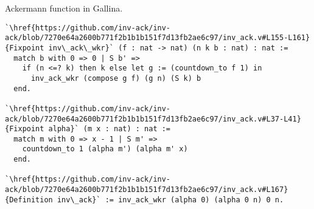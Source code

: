 Ackermann function in Gallina.
\begin{lstlisting}
`\href{https://github.com/inv-ack/inv-ack/blob/7270e64a2600b771f2b1b1b151f7d13fb2ae6c97/inv_ack.v#L155-L161} {Fixpoint inv\_ack\_wkr}` (f : nat -> nat) (n k b : nat) : nat :=
  match b with 0 => 0 | S b' =>
    if (n <=? k) then k else let g := (countdown_to f 1) in
      inv_ack_wkr (compose g f) (g n) (S k) b
  end.

`\href{https://github.com/inv-ack/inv-ack/blob/7270e64a2600b771f2b1b1b151f7d13fb2ae6c97/inv_ack.v#L37-L41}{Fixpoint alpha}` (m x : nat) : nat :=
  match m with 0 => x - 1 | S m' =>
    countdown_to 1 (alpha m') (alpha m' x)
  end.

`\href{https://github.com/inv-ack/inv-ack/blob/7270e64a2600b771f2b1b1b151f7d13fb2ae6c97/inv_ack.v#L167}{Definition inv\_ack}` := inv_ack_wkr (alpha 0) (alpha 0 n) 0 n.
\end{lstlisting}


